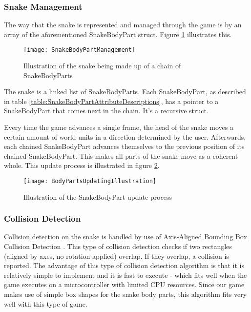 \subsubsection{Snake Management}
The way that the snake is represented and managed through the game is by an array of the aforementioned SnakeBodyPart struct. Figure \ref{SnakeBodyPartManagement} illustrates this.

\begin{figure}[H]
	\texttt{[image: SnakeBodyPartManagement]}
	\centering
	\caption{Illustration of the snake being made up of a chain of SnakeBodyParts}
	\label{SnakeBodyPartManagement}
\end{figure} 

The snake is a linked list \cite{LinkedLists} of SnakeBodyParts. Each SnakeBodyPart, as described in table \ref{table:SnakeBodyPartAttributeDescriptions}, has a pointer to a SnakeBodyPart that comes next in the chain. It's a recursive struct.

Every time the game advances a single frame, the head of the snake moves a certain amount of world units in a direction determined by the user. Afterwards, each chained SnakeBodyPart advances themselves to the previous position of its chained SnakeBodyPart. This makes all parts of the snake move as a coherent whole. This update process is illustrated in figure \ref{SnakeBodyPartUpdateProcess}.

\begin{figure}[H]
	\texttt{[image: BodyPartsUpdatingIllustration]}
	\centering
	\caption{Illustration of the SnakeBodyPart update process}
	\label{SnakeBodyPartUpdateProcess}
\end{figure} 

\subsubsection{Collision Detection}
\label{section:CollisionDetection}

Collision detection on the snake is handled by use of Axis-Aligned Bounding Box Collision Detection \cite{CollisionDetection}. This type of collision detection checks if two rectangles (aligned by axes, no rotation applied) overlap. If they overlap, a collision is reported. The advantage of this type of collision detection algorithm is that it is relatively simple to implement and it is fast to execute - which fits well when the game executes on a microcontroller with limited CPU resources. Since our game makes use of simple box shapes for the snake body parts, this algorithm fits very well with this type of game.








